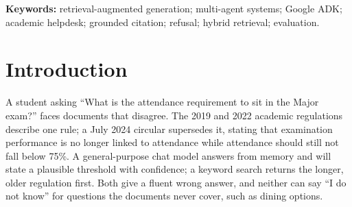 \documentclass[10pt,a4paper]{article}
\begin{document}
\begin{abstract}
\noindent
We built a multi-agent academic helpdesk for IIT Jodhpur that answers questions on rules, curriculum, the timetable and course offerings, drafts (never sends) emails to instructors, and refuses and logs everything else. An orchestrator routes each question to a policy, schedule or email agent. Rules are answered by retrieval over 33 official documents (390 chunks); counts, slots and contacts come from deterministic CSV tools. The evaluation set has 30 questions in four categories. Without a chat model, the evidence given to the agent is right for 24 of 25 answerable questions, 15 of 16 evidence verdicts are correct, 48 tool assertions pass, and the expected document ranks first for 10 of 11 policy questions (MRR 0.918). Trimming prompts and tool definitions cut a turn from about 120~s to about 70~s on a rate-limited hosted model. The main trade-off is that scope refusal cannot be enforced by retrieval distance (the in-scope and out-of-scope ranges overlap by 0.142) and so depends on the prompt. Model-answer scoring was not completed; explicitly labelled single-point estimates are given instead. The key lesson is to inspect what the model is shown: two defects were in the evidence, not the model.
\end{abstract}

\noindent\textbf{Keywords:} retrieval-augmented generation; multi-agent systems; Google ADK; academic helpdesk; grounded citation; refusal; hybrid retrieval; evaluation.

\tableofcontents
\clearpage

\section{Introduction}
A student asking ``What is the attendance requirement to sit in the Major exam?'' faces documents that disagree. The 2019 and 2022 academic regulations describe one rule; a July 2024 circular supersedes it, stating that examination performance is no longer linked to attendance while attendance should still not fall below 75\%. A general-purpose chat model answers from memory and will state a plausible threshold with confidence; a keyword search returns the longer, older regulation first. Both give a fluent wrong answer, and neither can say ``I do not know'' for questions the documents never cover, such as dining options.
\end{document}
